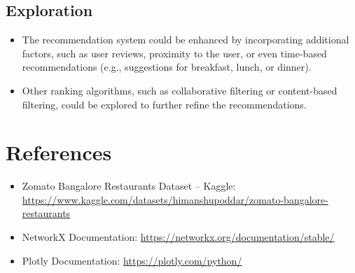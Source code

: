 \documentclass[fontsize=11pt]{article}
\begin{document}
\subsection*{Exploration}
\begin{itemize}
    \item The recommendation system could be enhanced by incorporating additional factors, such as user reviews, proximity to the user, or even time-based recommendations (e.g., suggestions for breakfast, lunch, or dinner).
    \item Other ranking algorithms, such as collaborative filtering or content-based filtering, could be explored to further refine the recommendations.
\end{itemize}

\section*{References}
\begin{itemize}
    \item Zomato Bangalore Restaurants Dataset – Kaggle: \url{https://www.kaggle.com/datasets/himanshupoddar/zomato-bangalore-restaurants}
    \item NetworkX Documentation: \url{https://networkx.org/documentation/stable/}
    \item Plotly Documentation: \url{https://plotly.com/python/}
\end{itemize}
\end{document}
